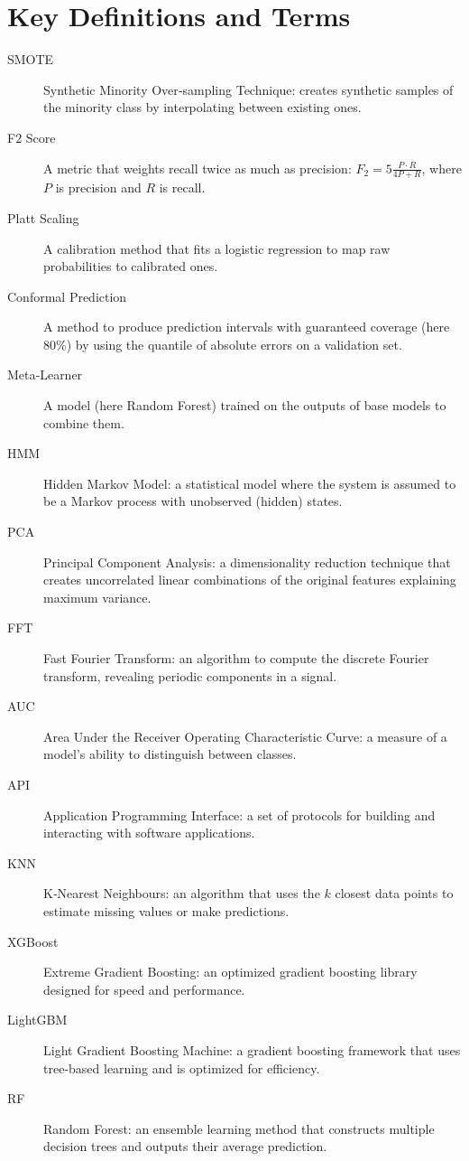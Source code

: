 \documentclass[12pt]{article}
\begin{document}
	\section{Key Definitions and Terms}
	\begin{description}
		\item[SMOTE] Synthetic Minority Over‑sampling Technique: creates synthetic samples of the minority class by interpolating between existing ones.
		\item[F2 Score] A metric that weights recall twice as much as precision: $F_2 = 5\frac{P\cdot R}{4P+R}$, where $P$ is precision and $R$ is recall.
		\item[Platt Scaling] A calibration method that fits a logistic regression to map raw probabilities to calibrated ones.
		\item[Conformal Prediction] A method to produce prediction intervals with guaranteed coverage (here 80\%) by using the quantile of absolute errors on a validation set.
		\item[Meta‑Learner] A model (here Random Forest) trained on the outputs of base models to combine them.
		\item[HMM] Hidden Markov Model: a statistical model where the system is assumed to be a Markov process with unobserved (hidden) states.
		\item[PCA] Principal Component Analysis: a dimensionality reduction technique that creates uncorrelated linear combinations of the original features explaining maximum variance.
		\item[FFT] Fast Fourier Transform: an algorithm to compute the discrete Fourier transform, revealing periodic components in a signal.
		\item[AUC] Area Under the Receiver Operating Characteristic Curve: a measure of a model's ability to distinguish between classes.
		\item[API] Application Programming Interface: a set of protocols for building and interacting with software applications.
		\item[KNN] K‑Nearest Neighbours: an algorithm that uses the $k$ closest data points to estimate missing values or make predictions.
		\item[XGBoost] Extreme Gradient Boosting: an optimized gradient boosting library designed for speed and performance.
		\item[LightGBM] Light Gradient Boosting Machine: a gradient boosting framework that uses tree‑based learning and is optimized for efficiency.
		\item[RF] Random Forest: an ensemble learning method that constructs multiple decision trees and outputs their average prediction.

\end{description}
\end{document}
